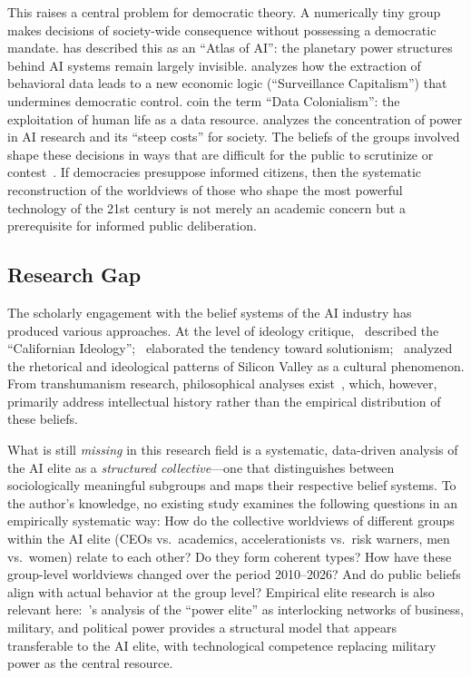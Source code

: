 \documentclass[12pt,a4paper]{article}
\begin{document}
This raises a central problem for democratic theory. A numerically tiny group makes decisions of society-wide consequence without possessing a democratic mandate. \citet{Crawford2021} has described this as an ``Atlas of AI'': the planetary power structures behind AI systems remain largely invisible. \citet{Zuboff2019} analyzes how the extraction of behavioral data leads to a new economic logic (``Surveillance Capitalism'') that undermines democratic control. \citet{Couldry2019} coin the term ``Data Colonialism'': the exploitation of human life as a data resource. \citet{Whittaker2021} analyzes the concentration of power in AI research and its ``steep costs'' for society. The beliefs of the groups involved shape these decisions in ways that are difficult for the public to scrutinize or contest~\citep{Floridi2019, Floridi2023}. If democracies presuppose informed citizens, then the systematic reconstruction of the worldviews of those who shape the most powerful technology of the 21st century is not merely an academic concern but a prerequisite for informed public deliberation.


\subsection{Research Gap}
\label{sec:einleitung:luecke}

The scholarly engagement with the belief systems of the AI industry has produced various approaches. At the level of ideology critique,~\citet{BarbCam1996} described the ``Californian Ideology'';~\citet{Morozov2013} elaborated the tendency toward solutionism;~\citet{Daub2020} analyzed the rhetorical and ideological patterns of Silicon Valley as a cultural phenomenon. From transhumanism research, philosophical analyses exist~\citep{Bostrom2005, MoreVitaMore2013, Coeckelbergh2020}, which, however, primarily address intellectual history rather than the empirical distribution of these beliefs.

What is still \emph{missing} in this research field is a systematic, data-driven analysis of the AI elite as a \emph{structured collective}---one that distinguishes between sociologically meaningful subgroups and maps their respective belief systems. To the author's knowledge, no existing study examines the following questions in an empirically systematic way: How do the collective worldviews of different groups within the AI elite (CEOs vs.\ academics, accelerationists vs.\ risk warners, men vs.\ women) relate to each other? Do they form coherent types? How have these group-level worldviews changed over the period 2010--2026? And do public beliefs align with actual behavior at the group level? Empirical elite research is also relevant here:~\citeauthor{Mills1956}'s analysis of the ``power elite'' as interlocking networks of business, military, and political power provides a structural model that appears transferable to the AI elite, with technological competence replacing military power as the central resource.
\end{document}
